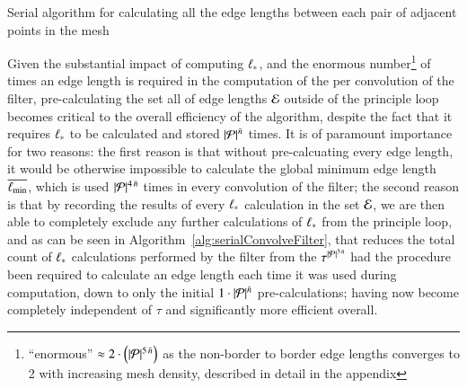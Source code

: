 \begin{algorithm}[ht]
	\DontPrintSemicolon


	\bigskip
	\caption{Serial algorithm for calculating all the edge lengths between each pair of adjacent points in the mesh\label{alg:serialCalculateEdgeLengths}}
\end{algorithm}

Given the substantial impact of computing ${\ell_\ast}$, and the enormous number\footnote{``enormous'' $\approx2\cdot\left (|\mathcal{P}|^{5\,\bar{n}}\right )$ as the non-border to border edge lengths converges to 2 with increasing mesh density, described in detail in the appendix} of times an edge length is required in the computation of the  per convolution of the filter, pre-calculating the set all of edge lengths $\mathcal{E}$ outside of the principle loop becomes critical to the overall efficiency of the algorithm, despite the fact that it requires ${\ell_\ast}$ to be calculated and stored $|\mathcal{P}|^{\bar{n}}$ times. It is of paramount importance for two reasons: the first reason is that without pre-calcuating every edge length, it would be otherwise impossible to calculate the global minimum edge length $\overline{\ell_\text{min}}$, which is used $|\mathcal{P}|^{4\,\bar{n}}$ times in every convolution of the filter; the second reason is that by recording the results of every $\ell_\ast$ calculation in the set $\mathcal{E}$, we are then able to completely exclude any further calculations of $\ell_\ast$ from the principle loop, and as can be seen in Algorithm~\ref{alg:serialConvolveFilter}, that reduces the total count of $\ell_\ast$ calculations performed by the filter from the $\tau^{|\mathcal{P}|^{3\,\bar{n}}}$ had the procedure been required to calculate an edge length each time it was used during computation, down to only the initial $1\cdot |\mathcal{P}|^{\bar{n}}$ pre-calculations; having now become completely independent of $\tau$ and significantly more efficient overall.%
%

